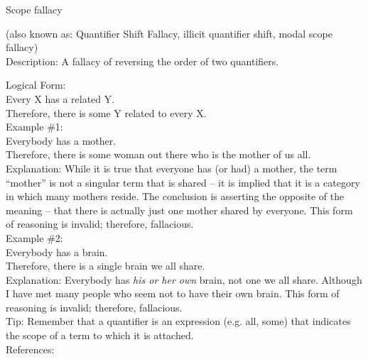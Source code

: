 \documentclass[a4paper,12pt,single,pdftex]{scrartcl}
\begin{document}
Scope fallacy
    
      (also known as: Quantifier Shift Fallacy, illicit quantifier shift, modal scope fallacy)
    \\

  
    Description: A fallacy of reversing the order of two quantifiers.

    
      Logical Form:
    \\

    
      Every X has a related Y.
    \\

    
      Therefore, there is some Y related to every X.
    \\

    
      Example \#1:
    \\

    
      Everybody has a mother.
    \\

    
      Therefore, there is some woman out there who is the mother of us all.
    \\

    
      Explanation: While it is true that everyone has (or had) a mother, the term “mother” is not a singular term that is shared -- it is implied that it is a category in which many mothers reside.  The conclusion is asserting the opposite of the meaning -- that there is actually just one mother shared by everyone.  This form of reasoning is invalid; therefore, fallacious.
    \\

    
      Example \#2:
    \\

    
      Everybody has a brain.
    \\

    
      Therefore, there is a single brain we all share.
    \\

    
      Explanation: Everybody has {\it his or her own} brain, not one we all share.  Although I have met many people who seem not to have their own brain.  This form of reasoning is invalid; therefore, fallacious.
    \\

    
      Tip: Remember that a quantifier is an expression (e.g. all, some) that indicates the scope of a term to which it is attached.
    \\

    References:

    
      
\end{document}
